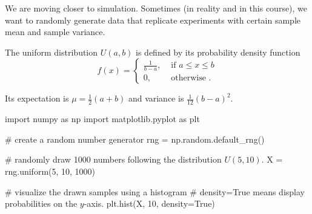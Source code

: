 \documentclass[../main.tex]{subfiles}
\begin{document}
We are moving closer to simulation. Sometimes (in reality and in this course), we want to randomly generate data that replicate experiments with certain sample mean and sample variance.

\begin{definition} \label{def:uniform-distribution}
  The uniform distribution \(U(a,b)\) is defined by its probability density function
  \[
    f(x) = 
    \begin{cases}
      \frac{1}{b-a}, &\text{ if } a \le x \le b \\[2ex]
      0,            &\text{ otherwise }.
    \end{cases}
  \]

  Its expectation is \(\mu = \frac{1}{2}(a + b)\)   and variance is \(\frac{1}{12}(b - a)^{2}\).
\end{definition}

\begin{center}
\end{center}


\begin{listing}[h!]
  \begin{pythoncode}
import numpy as np
import matplotlib.pyplot as plt

# create a random number generator
rng = np.random.default_rng()

# randomly draw 1000 numbers following the distribution $U(5,10)$.
X = rng.uniform(5, 10, 1000)

# visualize the drawn samples using a histogram
# density=True means display probabilities on the $y$-axis.
plt.hist(X, 10, density=True)
  \end{pythoncode}

  \caption{Python code for random number generation following \(U(a,b)\)}
  \label{lst:pseudorandom-number-generator}
\end{listing}
\end{document}
